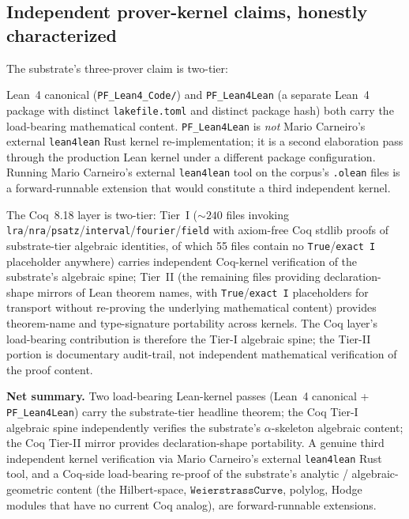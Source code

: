 \documentclass[11pt,a4paper]{amsart}
\theoremstyle{plain}
\theoremstyle{definition}
\begin{document}
\subsection{Independent prover-kernel claims, honestly characterized}\label{subsec:repro-three-prover}

The substrate's three-prover claim is two-tier:

\begin{description}[font=\normalfont\bfseries,leftmargin=2em,itemsep=2pt]
\item[Load-bearing mathematical verification (two provers).] Lean~4 canonical (\texttt{PF\_Lean4\_Code/}) and \texttt{PF\_Lean4Lean} (a separate Lean~4 package with distinct \texttt{lakefile.toml} and distinct package hash) both carry the load-bearing mathematical content. \texttt{PF\_Lean4Lean} is \emph{not} Mario Carneiro's external \texttt{lean4lean} Rust kernel re-implementation; it is a second elaboration pass through the production Lean kernel under a different package configuration. Running Mario Carneiro's external \texttt{lean4lean} tool on the corpus's \texttt{.olean} files is a forward-runnable extension that would constitute a third independent kernel.
\item[Structural audit-trail mirror (Coq).] The Coq~8.18 layer is two-tier: Tier~I ($\sim 240$ files invoking \texttt{lra}/\texttt{nra}/\texttt{psatz}/\texttt{interval}/\texttt{fourier}/\texttt{field} with axiom-free Coq stdlib proofs of substrate-tier algebraic identities, of which 55 files contain no \texttt{True}/\texttt{exact I} placeholder anywhere) carries independent Coq-kernel verification of the substrate's algebraic spine; Tier~II (the remaining files providing declaration-shape mirrors of Lean theorem names, with \texttt{True}/\texttt{exact I} placeholders for transport without re-proving the underlying mathematical content) provides theorem-name and type-signature portability across kernels. The Coq layer's load-bearing contribution is therefore the Tier-I algebraic spine; the Tier-II portion is documentary audit-trail, not independent mathematical verification of the proof content.
\end{description}

\textbf{Net summary.} Two load-bearing Lean-kernel passes (Lean~4 canonical + \texttt{PF\_Lean4Lean}) carry the substrate-tier headline theorem; the Coq Tier-I algebraic spine independently verifies the substrate's $\alpha$-skeleton algebraic content; the Coq Tier-II mirror provides declaration-shape portability. A genuine third independent kernel verification via Mario Carneiro's external \texttt{lean4lean} Rust tool, and a Coq-side load-bearing re-proof of the substrate's analytic / algebraic-geometric content (the Hilbert-space, $\texttt{WeierstrassCurve}$, polylog, Hodge modules that have no current Coq analog), are forward-runnable extensions.
\end{document}
